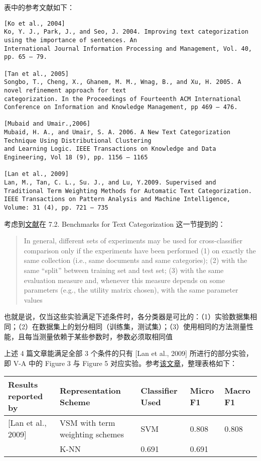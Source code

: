 \documentclass[11pt]{article}
\begin{document}
表中的参考文献如下：

\begin{verbatim}
[Ko et al., 2004] 
Ko, Y. J., Park, J., and Seo, J. 2004. Improving text categorization using the importance of sentences. An
International Journal Information Processing and Management, Vol. 40, pp. 65 – 79.

[Tan et al., 2005] 
Songbo, T., Cheng, X., Ghanem, M. M., Wnag, B., and Xu, H. 2005. A novel refinement approach for text
categorization. In the Proceedings of Fourteenth ACM International Conference on Information and Knowledge Management, pp 469 – 476.

[Mubaid and Umair.,2006] 
Mubaid, H. A., and Umair, S. A. 2006. A New Text Categorization Technique Using Distributional Clustering
and Learning Logic. IEEE Transactions on Knowledge and Data Engineering, Vol 18 (9), pp. 1156 – 1165

[Lan et al., 2009] 
Lan, M., Tan, C. L., Su. J., and Lu, Y.2009. Supervised and Traditional Term Weighting Methods for Automatic Text Categorization. IEEE Transactions on Pattern Analysis and Machine Intelligence, Volume: 31 (4), pp. 721 – 735
\end{verbatim}

考虑到\href{http://nmis.isti.cnr.it/sebastiani/Publications/ACMCS02.pdf}{文献}在
7.2. Benchmarks for Text Categorization 这一节提到的：

\begin{quote}
In general, different sets of experiments may be used for
cross-classifier comparison only if the experiments have been performed
(1) on exactly the same collection (i.e., same documents and same
categories); (2) with the same ``split'' between training set and test
set; (3) with the same evaluation measure and, whenever this measure
depends on some parameters (e.g., the utility matrix chosen), with the
same parameter values
\end{quote}

也就是说，仅当这些实验满足下述条件时，各分类器是可比的：（1）实验数据集相同；（2）在数据集上的划分相同（训练集，测试集）；（3）使用相同的方法测量性能，且每当测量依赖于某些参数时，参数必须取相同值

上述 4 篇文章能满足全部 3 个条件的只有 {[}Lan et al., 2009{]}
所进行的部分实验，即 V-A 中的 Figure 3 与 Figure 5
对应实验。参考\href{https://www-old.comp.nus.edu.sg/~tancl/publications/j2009/PAMI2007-v3.pdf}{该文章}，整理表格如下：

\begin{longtable}[]{@{}lllll@{}}
\toprule
Results reported by & Representation Scheme & Classifier Used & Micro F1
& Macro F1\tabularnewline
\midrule
\endhead
{[}Lan et al., 2009{]} & VSM with term weighting schemes & SVM & 0.808 &
0.808\tabularnewline
& K-NN & 0.691 & 0.691\tabularnewline
\bottomrule
\end{longtable}
\end{document}
